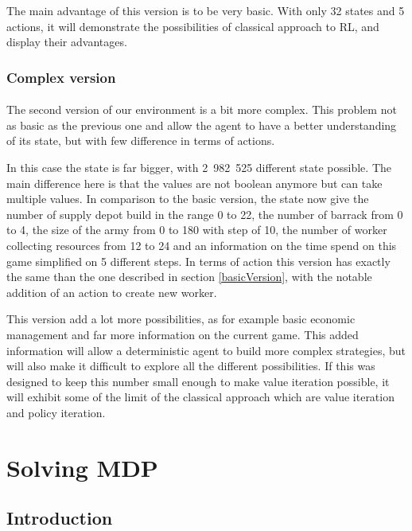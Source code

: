 \documentclass[twocolumn,a4paper,10pt]{article}
\begin{document}
The main advantage of this version is to be very basic. With only
32 states and 5 actions, it will demonstrate the possibilities of
classical approach to RL, and display their advantages.

\subsubsection{Complex version}

\paragraph{}

The second version of our environment is a bit more complex. This
problem not as basic as the previous one and allow the agent to have
a better understanding of its state, but with few difference in terms
of actions.

In this case the state is far bigger, with 2~982~525 different state
possible. The main difference here is that the values are not boolean
anymore but can take multiple values. In comparison to the basic version,
the state now give the number of supply depot build in the range 0
to 22, the number of barrack from 0 to 4, the size of the army from
0 to 180 with step of 10, the number of worker collecting resources
from 12 to 24 and an information on the time spend on this game simplified
on 5 different steps. In terms of action this version has exactly
the same than the one described in section \ref{basicVersion}, with
the notable addition of an action to create new worker.

This version add a lot more possibilities, as for example basic economic
management and far more information on the current game. This added
information will allow a deterministic agent to build more complex
strategies, but will also make it difficult to explore all the different
possibilities. If this was designed to keep this number small enough
to make value iteration possible, it will exhibit some of the limit
of the classical approach which are value iteration and policy iteration.

\section{Solving MDP}

\subsection{Introduction}
\end{document}
